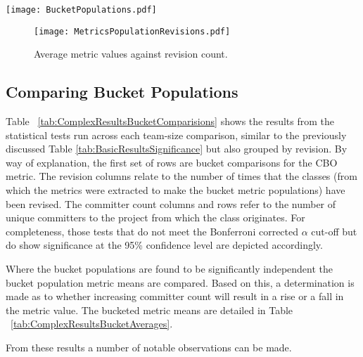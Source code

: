 \begin{table}
\centering 
{}
\begin{tabular}
 \centering 
 \texttt{[image: BucketPopulations.pdf]}
 \label{tab:BucketPopulations}
\end{tabular}
\end{table}

\begin{figure}[htbp!] 
\centering    
\texttt{[image: MetricsPopulationRevisions.pdf]}
\caption{Average metric values against revision count.}
\label{fig:MetricsPopulationRevisions}
\end{figure}

\subsection{Comparing Bucket Populations}
Table ~\ref{tab:ComplexResultsBucketComparisions} shows the results from the statistical tests run across each team-size comparison, similar to the previously discussed Table \ref{tab:BasicResultsSignificance} but also grouped by revision. By way of explanation, the first set of rows are bucket comparisons for the CBO metric. The revision columns relate to the number of times that the classes (from which the metrics were extracted to make the bucket metric populations) have been revised. The committer count columns and rows refer to the number of unique committers to the project from which the class originates. For completeness, those tests that do not meet the Bonferroni corrected $\alpha$ cut-off but do show significance at the 95\% confidence level are depicted accordingly. 

Where the bucket populations are found to be significantly independent the bucket population metric means are compared. Based on this, a determination is made as to whether increasing committer count will result in a rise or a fall in the metric value. The bucketed metric means are detailed in Table ~\ref{tab:ComplexResultsBucketAverages}.

From these results a number of notable observations can be made. 

